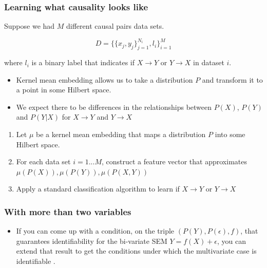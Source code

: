 \documentclass[20pt]{extreport}
\begin{document}
\subsubsection*{Learning what causality looks like {\cite{LopezPaz2014}}}

Suppose we had $M$ different causal pairs data sets. 

\begin{equation*}
D= \{\{x_{j},y_{j}\}_{j=1}^{N_{i}},l_{i}\}_{i=1}^{M}
\end{equation*}

where $l_{i}$ is a binary label that indicates if $X \rightarrow Y$ or $Y \rightarrow X$ in dataset $i$.

\begin{itemize}
\item Kernel mean embedding allows us to take a distribution $P$ and transform it to a point in some Hilbert space.
\item We expect there to be differences in the relationships between $P(X)$, $P(Y)$ and $P(Y|X)$ for $X \rightarrow Y$ and $Y \rightarrow X$
\end{itemize}
 
\begin{algorithm}
\caption{\label{alg:causallearn}}
\begin{enumerate}
\item Let $\mu$ be a kernel mean embedding that maps a distribution $P$ into some Hilbert space.
\item For each data set $i={1...M}$, construct a feature vector that approximates ${\mu(P(X)), \mu(P(Y)),\mu(P(X,Y)) }$
\item Apply a standard classification algorithm to learn if $X\rightarrow Y$ or $Y \rightarrow X$
\end{enumerate}
\end{algorithm}
\subsubsection*{With more than two variables}
\begin{itemize}
\item If you can come up with a condition, on the triple $(P(Y), P(\epsilon), f)$, that guarantees identifiability for the bi-variate SEM $Y = f(X) + \epsilon$, you can extend that result to get the conditions under which the multivariate case is identifiable \cite{Peters2014}.

\end{itemize}
\end{document}

